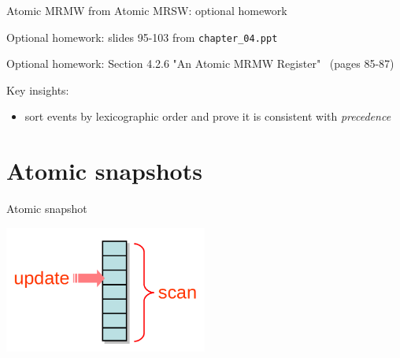 \begin{frame}[t,fragile]{Atomic MRMW from Atomic MRSW: optional homework}

Optional homework: slides 95-103 from \texttt{chapter\_04.ppt}

Optional homework: Section 4.2.6 "An Atomic MRMW Register" \ (pages 85-87)

Key insights: 
\begin{itemize}
  \item sort events by lexicographic order and prove it is consistent with \textit{precedence}
\end{itemize}

\end{frame}

\section{Atomic snapshots}
\showTOC

\begin{frame}{Atomic snapshot}

\begin{center}
  \includegraphics[width=0.5\textwidth]{./pics/snapshot1.png}
\end{center}

\end{frame}


